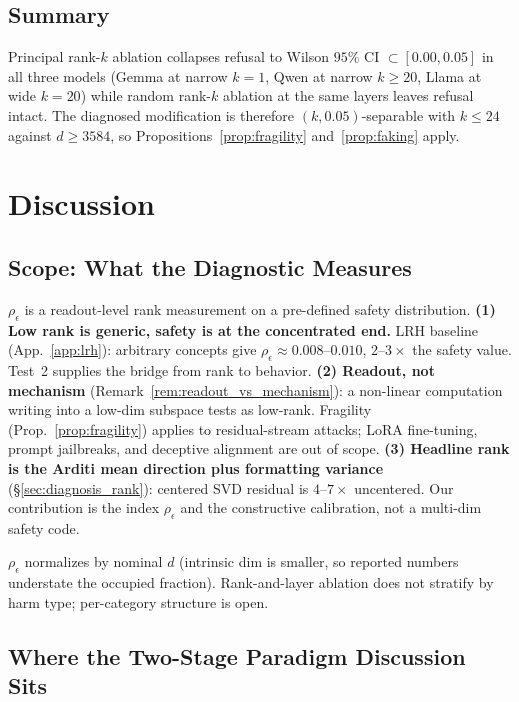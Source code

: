 \documentclass[10pt]{article}
\theoremstyle{definition}
\theoremstyle{remark}
\begin{document}
\subsection{Summary}

Principal rank-$k$ ablation collapses refusal to Wilson
$95\%$ CI $\subset [0.00, 0.05]$ in all three models
(Gemma at narrow $k=1$, Qwen at narrow $k\geq 20$,
Llama at wide $k=20$) while random rank-$k$ ablation
at the same layers leaves refusal intact.  The
diagnosed modification is therefore $(k,0.05)$-separable
with $k \leq 24$ against $d \geq 3584$, so
Propositions~\ref{prop:fragility} and~\ref{prop:faking}
apply.


\section{Discussion}
\label{sec:discussion}

\subsection{Scope: What the Diagnostic Measures}
\label{sec:discussion_what}

$\rho_{\epsilon}$ is a readout-level rank measurement
on a pre-defined safety distribution.
\textbf{(1) Low rank is generic, safety is at the
concentrated end.}  LRH baseline (App.~\ref{app:lrh}):
arbitrary concepts give $\rho_{\epsilon}\!\approx\!0.008$--$0.010$,
$2$--$3\times$ the safety value.  Test~2 supplies the
bridge from rank to behavior.
\textbf{(2) Readout, not mechanism}
(Remark~\ref{rem:readout_vs_mechanism}): a non-linear
computation writing into a low-dim subspace tests as
low-rank.  Fragility (Prop.~\ref{prop:fragility})
applies to residual-stream attacks; LoRA fine-tuning,
prompt jailbreaks, and deceptive alignment are out of
scope.
\textbf{(3) Headline rank is the Arditi mean direction
plus formatting variance} (\S\ref{sec:diagnosis_rank}): centered SVD
residual is $4$--$7\times$ uncentered.  Our contribution
is the index $\rho_{\epsilon}$ and the constructive
calibration, not a multi-dim safety code.

$\rho_{\epsilon}$ normalizes by nominal $d$ (intrinsic
dim is smaller, so reported numbers understate the
occupied fraction).  Rank-and-layer ablation does not
stratify by harm type; per-category structure is open.

\subsection{Where the Two-Stage Paradigm Discussion Sits}
\label{sec:discussion_paradigm}
\end{document}
